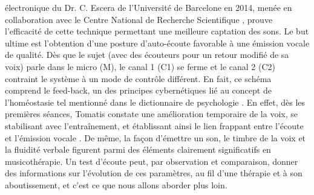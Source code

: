 électronique du Dr. C. Escera
de l'Université de Barcelone en 2014, menée en collaboration avec le
Centre National de Recherche Scientifique \autocite{escera-key}, prouve l'efficacité de cette technique permettant
une meilleure
captation des sons. %
Le but ultime est l'obtention d'une posture d'auto-écoute favorable à une
          émission vocale de qualité.
Dès que le sujet (avec
des écouteurs pour un retour modifié de sa voix) parle
dans le micro (M), le canal 1 (C1) se ferme et  le canal 2 (C2) contraint le
système à un mode de contrôle différent.
En fait, ce schéma comprend le feed-back, un des principes
cybernétiques lié au concept de l'homéostasie tel
mentionné dans le dictionnaire de
psychologie \autocite[298]{doronparot}.
En effet, dès les premières
séances, Tomatis constate une amélioration temporaire de la voix, se
stabilisant avec l'entraînement, et établissant ainsi le
lien frappant entre l'écoute et
  l'émission vocale \autocite {tomatisoreilletvie}.
De même, la façon d'émettre un son, le timbre de la voix et la fluidité
verbale figurent parmi des
éléments clairement significatifs en musicothérapie.
Un test d'écoute peut, par observation et comparaison, donner des informations sur l'évolution de ces 
paramètres, au fil d'une thérapie et à son aboutissement, et c'est ce que nous allons 
aborder plus loin.




